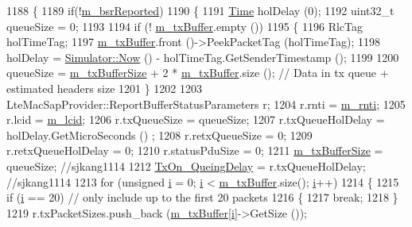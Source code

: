 \begin{DoxyCode}
1188 \{
1189   \textcolor{keywordflow}{if}(!\hyperlink{classns3_1_1LteRlcUmLowLat_a4c9b565124e3f589008eaece72f46e3e}{m\_bsrReported})
1190   \{
1191     \hyperlink{namespacens3_1_1TracedValueCallback_a7ffd3e7c142ffe7c8a1d2db9b8de38ec}{Time} holDelay (0);
1192     uint32\_t queueSize = 0;
1193 
1194     \textcolor{keywordflow}{if} (! \hyperlink{classns3_1_1LteRlcUmLowLat_aaeef0eed7788f26d7564a84a0c546f74}{m\_txBuffer}.empty ())
1195       \{
1196         RlcTag holTimeTag;
1197         \hyperlink{classns3_1_1LteRlcUmLowLat_aaeef0eed7788f26d7564a84a0c546f74}{m\_txBuffer}.front ()->PeekPacketTag (holTimeTag);
1198         holDelay = \hyperlink{classns3_1_1Simulator_ac3178fa975b419f7875e7105be122800}{Simulator::Now} () - holTimeTag.GetSenderTimestamp ();
1199 
1200         queueSize = \hyperlink{classns3_1_1LteRlcUmLowLat_a730b3933118b7d511e4aedab828e07aa}{m\_txBufferSize} + 2 * \hyperlink{classns3_1_1LteRlcUmLowLat_aaeef0eed7788f26d7564a84a0c546f74}{m\_txBuffer}.size (); \textcolor{comment}{// Data in tx queue +
       estimated headers size}
1201       \}
1202 
1203     LteMacSapProvider::ReportBufferStatusParameters r;
1204     r.rnti = \hyperlink{classns3_1_1LteRlc_a48ab0a78e7f2687337075b1c8832df70}{m\_rnti};
1205     r.lcid = \hyperlink{classns3_1_1LteRlc_a051085e9b27883e7ba4b98ad7242fd8a}{m\_lcid};
1206     r.txQueueSize = queueSize;
1207     r.txQueueHolDelay = holDelay.GetMicroSeconds () ;
1208     r.retxQueueSize = 0;
1209     r.retxQueueHolDelay = 0;
1210     r.statusPduSize = 0;
1211     \hyperlink{classns3_1_1LteRlcUmLowLat_a730b3933118b7d511e4aedab828e07aa}{m\_txBufferSize} = queueSize; \textcolor{comment}{//sjkang1114}
1212     \hyperlink{classns3_1_1LteRlcUmLowLat_a3f4fe8416c6ad14ff611b0b57f961afa}{TxOn\_QueingDelay} = r.txQueueHolDelay; \textcolor{comment}{//sjkang1114}
1213     \textcolor{keywordflow}{for} (\textcolor{keywordtype}{unsigned} \hyperlink{bernuolliDistribution_8m_a6f6ccfcf58b31cb6412107d9d5281426}{i} = 0; \hyperlink{bernuolliDistribution_8m_a6f6ccfcf58b31cb6412107d9d5281426}{i} < \hyperlink{classns3_1_1LteRlcUmLowLat_aaeef0eed7788f26d7564a84a0c546f74}{m\_txBuffer}.size(); \hyperlink{bernuolliDistribution_8m_a6f6ccfcf58b31cb6412107d9d5281426}{i}++)
1214     \{
1215       \textcolor{keywordflow}{if} (\hyperlink{bernuolliDistribution_8m_a6f6ccfcf58b31cb6412107d9d5281426}{i} == 20)  \textcolor{comment}{// only include up to the first 20 packets}
1216       \{
1217         \textcolor{keywordflow}{break};
1218       \}
1219       r.txPacketSizes.push\_back (\hyperlink{classns3_1_1LteRlcUmLowLat_aaeef0eed7788f26d7564a84a0c546f74}{m\_txBuffer}[\hyperlink{bernuolliDistribution_8m_a6f6ccfcf58b31cb6412107d9d5281426}{i}]->GetSize ());

\end{DoxyCode}
